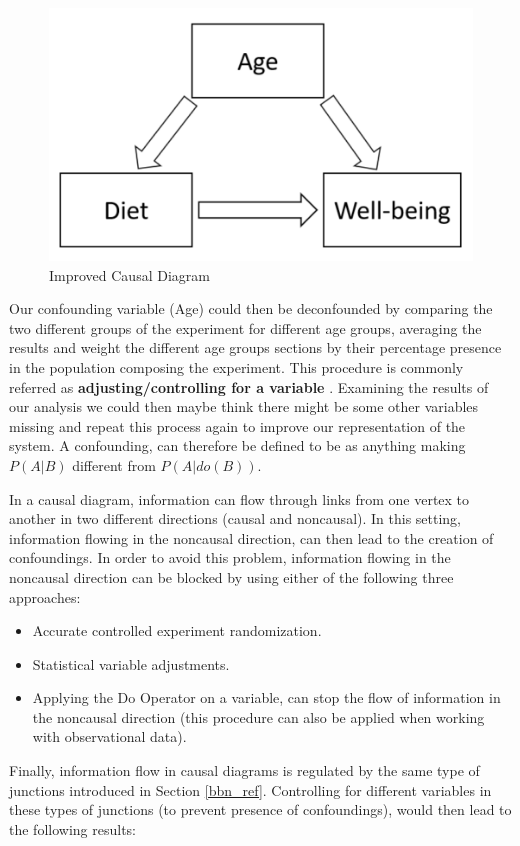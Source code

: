 \begin{figure}[ht!]%
    \centering
    \includegraphics[width=0.4\linewidth]{latex/images/simple_ex2.pdf}
    \vspace{-0.2cm}
    \caption{Improved Causal Diagram}
    \label{cex2}
\end{figure}
\vspace{-0.5cm}

Our confounding variable (Age) could then be deconfounded by comparing the two different groups of the experiment for different age groups, averaging the results and weight the different age groups sections by their percentage presence in the population composing the experiment. This procedure is commonly referred as \textbf{adjusting/controlling for a variable} \cite{why}. Examining the results of our analysis we could then maybe think there might be some other variables missing and repeat this process again to improve our representation of the system. A confounding, can therefore be defined to be as anything making $P(A|B)$ different from $P(A|do(B))$.   

In a causal diagram, information can flow through links from one vertex to another in two different directions (causal and noncausal). In this setting, information flowing in the noncausal direction, can then lead to the creation of confoundings. In order to avoid this problem, information flowing in the noncausal direction can be blocked by using either of the following three approaches:

\begin{itemize}
    \item Accurate controlled experiment randomization.
    \item Statistical variable adjustments.
    \item Applying the Do Operator on a variable, can stop the flow of information in the noncausal direction (this procedure can also be applied when working with observational data).
\end{itemize}

Finally, information flow in causal diagrams is regulated by the same type of junctions introduced in Section \ref{bbn_ref}. Controlling for different variables in these types of junctions (to prevent presence of confoundings), would then lead to the following results:

